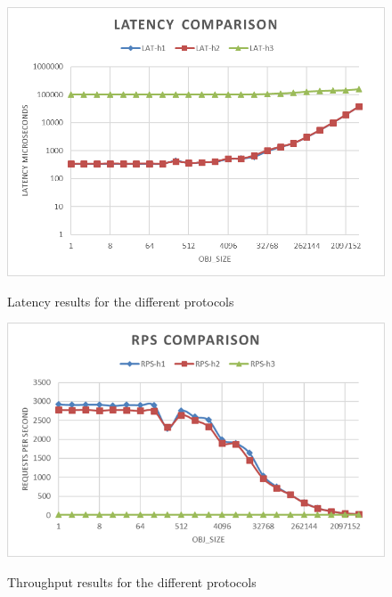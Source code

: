 \documentclass[runningheads]{llncs}
\begin{document}
\begin{figure}
    \centering
    \begin{minipage}{0.49\textwidth}
        \centering
        \includegraphics[width=1\textwidth]{lat-comparison-h2load.png}\vspace{-1em}
        \caption{Latency results for the different protocols}\vspace{-1.5em}
		\label {fig:lat-comp}
    \end{minipage}\hfill
    \begin{minipage}{0.49\textwidth}
        \centering
        \includegraphics[width=1\textwidth]{rps-comparison-h2load.png}\vspace{-1em}
        \caption{Throughput results for the different protocols}\vspace{-1.5em}
		\label {fig:rps-comp}
    \end{minipage}
\end{figure}
\end{document}
